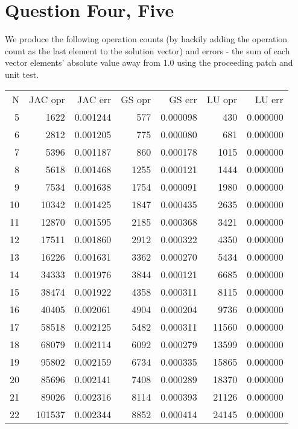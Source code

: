 \documentclass[11pt]{article}
\begin{document}
\section{Question Four, Five}
\label{sec:org8eea2ae}
We produce the following operation counts (by hackily adding the operation count as the last element
to the solution vector) and errors - the sum of each vector elements' absolute value away from 1.0
using the proceeding patch and unit test.

\begin{center}
\begin{tabular}{rrrrrrr}
N & JAC opr & JAC err & GS opr & GS err & LU opr & LU err\\[0pt]
5 & 1622 & 0.001244 & 577 & 0.000098 & 430 & 0.000000\\[0pt]
6 & 2812 & 0.001205 & 775 & 0.000080 & 681 & 0.000000\\[0pt]
7 & 5396 & 0.001187 & 860 & 0.000178 & 1015 & 0.000000\\[0pt]
8 & 5618 & 0.001468 & 1255 & 0.000121 & 1444 & 0.000000\\[0pt]
9 & 7534 & 0.001638 & 1754 & 0.000091 & 1980 & 0.000000\\[0pt]
10 & 10342 & 0.001425 & 1847 & 0.000435 & 2635 & 0.000000\\[0pt]
11 & 12870 & 0.001595 & 2185 & 0.000368 & 3421 & 0.000000\\[0pt]
12 & 17511 & 0.001860 & 2912 & 0.000322 & 4350 & 0.000000\\[0pt]
13 & 16226 & 0.001631 & 3362 & 0.000270 & 5434 & 0.000000\\[0pt]
14 & 34333 & 0.001976 & 3844 & 0.000121 & 6685 & 0.000000\\[0pt]
15 & 38474 & 0.001922 & 4358 & 0.000311 & 8115 & 0.000000\\[0pt]
16 & 40405 & 0.002061 & 4904 & 0.000204 & 9736 & 0.000000\\[0pt]
17 & 58518 & 0.002125 & 5482 & 0.000311 & 11560 & 0.000000\\[0pt]
18 & 68079 & 0.002114 & 6092 & 0.000279 & 13599 & 0.000000\\[0pt]
19 & 95802 & 0.002159 & 6734 & 0.000335 & 15865 & 0.000000\\[0pt]
20 & 85696 & 0.002141 & 7408 & 0.000289 & 18370 & 0.000000\\[0pt]
21 & 89026 & 0.002316 & 8114 & 0.000393 & 21126 & 0.000000\\[0pt]
22 & 101537 & 0.002344 & 8852 & 0.000414 & 24145 & 0.000000\\[0pt]

\end{tabular}
\end{center}
\end{document}
